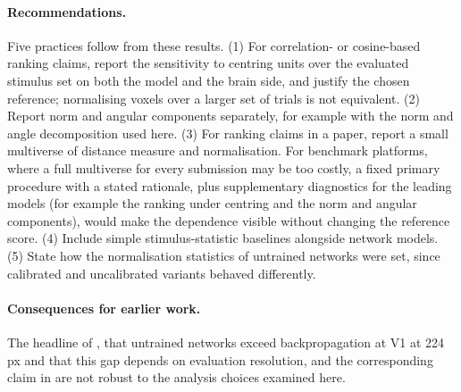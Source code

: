 \paragraph{Recommendations.}
Five practices follow from these results. (1) For cor\-re\-la\-tion- or cosine-based ranking claims, report the sensitivity to centring units over the evaluated stimulus set on both the model and the brain side, and justify the chosen reference; normalising voxels over a larger set of trials is not equivalent. (2) Report
norm and angular components separately, for example with the norm and angle
decomposition used here. (3) For ranking claims in a paper, report a small multiverse of distance measure and normalisation. For benchmark platforms, where a full multiverse for every submission may be too costly, a fixed primary procedure with a stated rationale, plus supplementary diagnostics for the leading models (for example the ranking under centring and the norm and angular components), would make the dependence visible without changing the reference score. (4) Include simple stimulus-statistic baselines
alongside network models. (5) State how the normalisation statistics of untrained
networks were set, since calibrated and uncalibrated variants behaved differently.

\paragraph{Consequences for earlier work.}
The headline of \citet{evalres}, that untrained networks exceed backpropagation at V1
at 224\,px and that this gap depends on evaluation resolution, and the corresponding
claim in \citet{lrrsa} are not robust to the analysis choices examined here.


